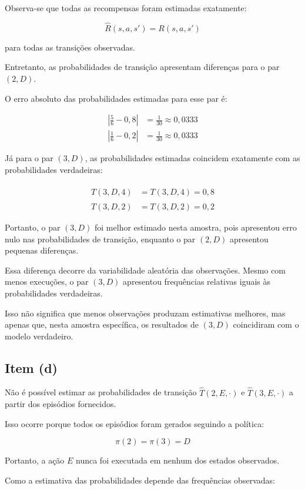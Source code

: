 Observa-se que todas as recompensas
foram estimadas exatamente:

\[
    \hat{R}(s,a,s')=R(s,a,s')
\]

para todas as transições observadas.

Entretanto, as probabilidades de transição
apresentam diferenças para o par $(2,D)$.

O erro absoluto das probabilidades
estimadas para esse par é:

\[
\begin{aligned}
\left|\frac{5}{6}-0{,}8\right|
&=\frac{1}{30}\approx0{,}0333
\\[6pt]
\left|\frac{1}{6}-0{,}2\right|
&=\frac{1}{30}\approx0{,}0333
\end{aligned}
\]

Já para o par $(3,D)$, as probabilidades
estimadas coincidem exatamente com
as probabilidades verdadeiras:

\[
\begin{aligned}
\hat{T}(3,D,4)&=T(3,D,4)=0{,}8\\
\hat{T}(3,D,2)&=T(3,D,2)=0{,}2
\end{aligned}
\]

Portanto, o par $(3,D)$ foi melhor
estimado nesta amostra, pois apresentou
erro nulo nas probabilidades de transição,
enquanto o par $(2,D)$ apresentou
pequenas diferenças.

Essa diferença decorre da variabilidade
aleatória das observações. Mesmo com
menos execuções, o par $(3,D)$ apresentou
frequências relativas iguais às
probabilidades verdadeiras.

Isso não significa que menos observações
produzam estimativas melhores, mas apenas
que, nesta amostra específica, os
resultados de $(3,D)$ coincidiram
com o modelo verdadeiro.


\subsection{Item (d)}

Não é possível estimar as probabilidades
de transição $\hat{T}(2,E,\cdot)$ e
$\hat{T}(3,E,\cdot)$ a partir dos
episódios fornecidos.

Isso ocorre porque todos os episódios
foram gerados seguindo a política:

\[
    \pi(2)=\pi(3)=D
\]

Portanto, a ação $E$ nunca foi executada
em nenhum dos estados observados.

Como a estimativa das probabilidades
depende das frequências observadas:


